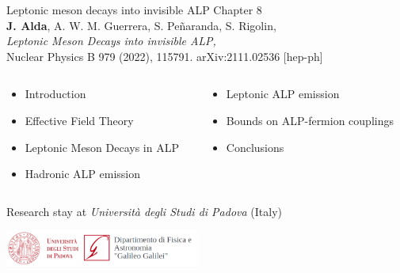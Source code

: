 \documentclass[mathserif, 10pt, dvipsnames]{beamer}
\begin{document}
\begin{frame}[plain] %
\begin{block}{\huge Leptonic meson decays into invisible ALP}
    Chapter 8 \\
    {\color{red}\textbf{J. Alda}, A. W. M. Guerrera, S. Peñaranda, S. Rigolin, \\
    \textit{Leptonic Meson Decays into invisible ALP,}\\
    Nuclear Physics B 979 (2022), 115791. arXiv:2111.02536 [hep-ph]}
\end{block}

\vspace{0.6cm}

\begin{columns}
\begin{column}{0.48\textwidth}
\begin{itemize}
\item Introduction
\item Effective Field Theory
\item Leptonic Meson Decays in ALP
\item Hadronic ALP emission
\end{itemize}
\end{column}
\begin{column}{0.48\textwidth}
\begin{itemize}
\item Leptonic ALP emission
\item Bounds on ALP-fermion couplings
\item Conclusions
\end{itemize}
\end{column}
\end{columns}

\vspace{0.6cm}
Research stay at \textit{Università degli Studi di Padova} (Italy)\\
\begin{center}
    \includegraphics[height = 1.2cm]{logos/Padova.png}
\end{center}

\end{frame}
\end{document}

